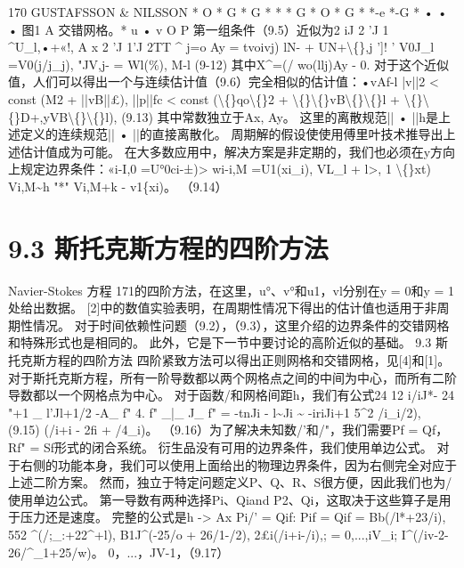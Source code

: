 \documentclass[UTF8,11pt,a4paper,openany,fontset=fandol]{ctexbook}
\begin{document}
170 GUSTAFSSON \& NILSSON * O * G * G * * * G * O * G * *-e *-G * • • • 图1 A 交错网格。* u • v O P 第一组条件（9.5）近似为2 iJ 2 'J 1 \textasciicircum{}U\_l,•+«!, A x 2 'J 1'J 2TT \textasciicircum{} j=o Ay = tvoivj) lN- + UN+\textbackslash\{\},j ']! ' V0J\_l =V0(j/j\_j), "JV,j- = Wl(\%), M-l (9-12) 其中X\textasciicircum{}=(/ wo(llj)Ay - 0. 对于这个近似值，人们可以得出一个与连续估计值（9.6）完全相似的估计值：•vAf-l |v||2 < const (M2 + ||vB||£), ||p||fc < const (\textbackslash\{\}qo\textbackslash\{\}2 + \textbackslash\{\}\textbackslash\{\}vB\textbackslash\{\}\textbackslash\{\}l + \textbackslash\{\}\textbackslash\{\}D+,yVB\textbackslash\{\}\textbackslash\{\}l), (9.13) 其中常数独立于Ax, Ay。 这里的离散规范|| • ||h是上述定义的连续规范|| • ||的直接离散化。 周期解的假设使使用傅里叶技术推导出上述估计值成为可能。 在大多数应用中，解决方案是非定期的，我们也必须在y方向上规定边界条件：«i-I,0 =U°0ci-±)> wi-i,M =U1(xi\_i), VL\_l + l>, 1 \textbackslash\{\}xt) Vi,M\textasciitilde{}h "*" Vi,M+k - v1\{xi)。 （9.14）

\section{9.3 斯托克斯方程的四阶方法}
Navier-Stokes 方程 171的四阶方法，在这里，u°、v°和u1，vl分别在y = 0和y = 1处给出数据。 [2]中的数值实验表明，在周期性情况下得出的估计值也适用于非周期性情况。 对于时间依赖性问题（9.2），（9.3），这里介绍的边界条件的交错网格和特殊形式也是相同的。 此外，它是下一节中要讨论的高阶近似的基础。 9.3 斯托克斯方程的四阶方法 四阶紧致方法可以得出正则网格和交错网格，见[4]和[1]。 对于斯托克斯方程，所有一阶导数都以两个网格点之间的中间为中心，而所有二阶导数都以一个网格点为中心。 对于函数/和网格间距h，我们有公式24 12 i/iJ*- 24 "+1 \_ l'Jl+1/2 -A\_ f" 4. f" \_|\_ J\_ f" = -tnJi - l\textasciitilde{}Ji \textasciitilde{} -iriJi+1 5\textasciicircum{}2 /i\_i/2), (9.15) (/i+i - 2fi + /4\_i)。 （9.16）为了解决未知数/'和/"，我们需要Pf = Qf，Rf" = Sf形式的闭合系统。 衍生品没有可用的边界条件，我们使用单边公式。 对于右侧的功能本身，我们可以使用上面给出的物理边界条件，因为右侧完全对应于上述二阶方案。 然而，独立于特定问题定义P、Q、R、S很方便，因此我们也为/使用单边公式。 第一导数有两种选择Pi、Qiand P2、Qi，这取决于这些算子是用于压力还是速度。 完整的公式是h -> Ax Pi/' = Qif: Pif = Qif = Bb(/l*+23/i), 552 \textasciicircum{}(/;\_:+22\textasciicircum{}+l), B1J\textasciicircum{}(-25/o + 26/1-/2), 2£i(/i+i-/i),; = 0,...,iV\_i; I\textasciicircum{}(/iv-2-26/\textasciicircum{}\_1+25/w)。 0，...，JV-1，（9.17）
\end{document}
